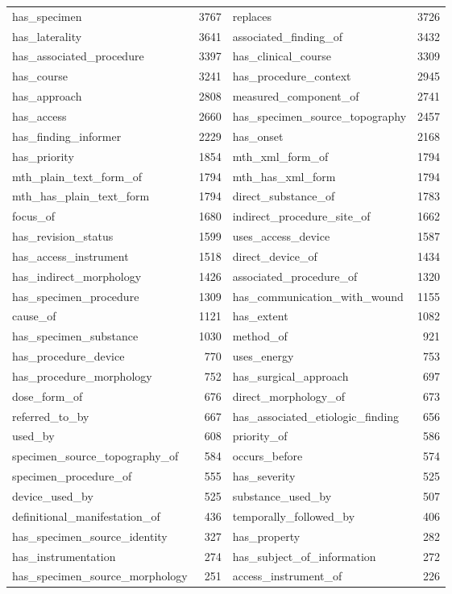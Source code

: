 \documentclass[11pt, a4paper]{article}
\begin{document}
\begin{table}[ht]
{\begin{adjustbox}{center}
\begin{tabular}{lr | lr}
has\_specimen&3767&replaces&3726\\
has\_laterality&3641&associated\_finding\_of&3432\\
has\_associated\_procedure&3397&has\_clinical\_course&3309\\
has\_course&3241&has\_procedure\_context&2945\\
has\_approach&2808&measured\_component\_of&2741\\
has\_access&2660&has\_specimen\_source\_topography&2457\\
has\_finding\_informer&2229&has\_onset&2168\\
has\_priority&1854&mth\_xml\_form\_of&1794\\
mth\_plain\_text\_form\_of&1794&mth\_has\_xml\_form&1794\\
mth\_has\_plain\_text\_form&1794&direct\_substance\_of&1783\\
focus\_of&1680&indirect\_procedure\_site\_of&1662\\
has\_revision\_status&1599&uses\_access\_device&1587\\
has\_access\_instrument&1518&direct\_device\_of&1434\\
has\_indirect\_morphology&1426&associated\_procedure\_of&1320\\
has\_specimen\_procedure&1309&has\_communication\_with\_wound&1155\\
cause\_of&1121&has\_extent&1082\\
has\_specimen\_substance&1030&method\_of&921\\
has\_procedure\_device&770&uses\_energy&753\\
has\_procedure\_morphology&752&has\_surgical\_approach&697\\
dose\_form\_of&676&direct\_morphology\_of&673\\
referred\_to\_by&667&has\_associated\_etiologic\_finding&656\\
used\_by&608&priority\_of&586\\
specimen\_source\_topography\_of&584&occurs\_before&574\\
specimen\_procedure\_of&555&has\_severity&525\\
device\_used\_by&525&substance\_used\_by&507\\
definitional\_manifestation\_of&436&temporally\_followed\_by&406\\
has\_specimen\_source\_identity&327&has\_property&282\\
has\_instrumentation&274&has\_subject\_of\_information&272\\
has\_specimen\_source\_morphology&251&access\_instrument\_of&226\\

\end{tabular}
\end{adjustbox}}
\end{table}
\end{document}
